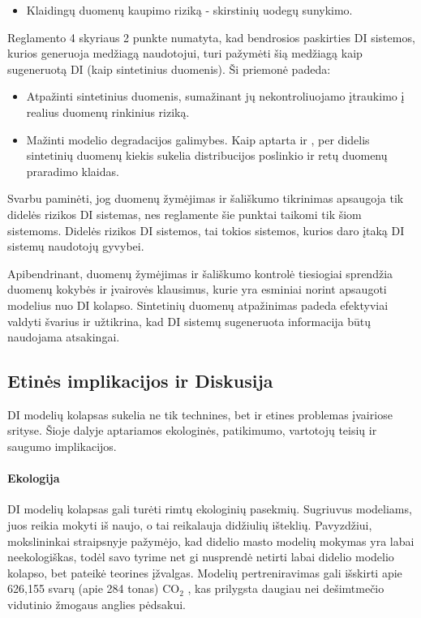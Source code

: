 \documentclass{VUMIFInfKursinis}
\begin{document}
\begin{itemize}
    \item  Klaidingų duomenų kaupimo riziką - skirstinių uodegų sunykimo.
\end{itemize}

Reglamento 4 skyriaus 2 punkte numatyta, kad bendrosios paskirties DI sistemos, kurios generuoja medžiagą naudotojui, turi pažymėti šią medžiagą kaip sugeneruotą DI (kaip sintetinius duomenis). Ši priemonė padeda:

\begin{itemize}
    \item Atpažinti sintetinius duomenis, sumažinant jų nekontroliuojamo įtraukimo į realius duomenų rinkinius riziką.
    \item Mažinti modelio degradacijos galimybes. Kaip aptarta \cite{AICollapseNature} ir \cite{DesniuPasiulymai}, per didelis sintetinių duomenų kiekis sukelia distribucijos poslinkio ir retų duomenų praradimo klaidas.
\end{itemize}

Svarbu paminėti, jog duomenų žymėjimas ir šališkumo tikrinimas apsaugoja tik didelės rizikos DI sistemas, nes reglamente šie punktai taikomi tik šiom sistemoms. Didelės rizikos DI sistemos, tai tokios sistemos, kurios daro įtaką DI sistemų naudotojų gyvybei.

Apibendrinant, duomenų žymėjimas ir šališkumo kontrolė tiesiogiai sprendžia duomenų kokybės ir įvairovės klausimus, kurie yra esminiai norint apsaugoti modelius nuo DI kolapso. Sintetinių duomenų atpažinimas padeda efektyviai valdyti švarius ir užtikrina, kad DI sistemų sugeneruota informacija būtų naudojama atsakingai.



\subsection{Etinės implikacijos ir Diskusija}

DI modelių kolapsas sukelia ne tik technines, bet ir etines problemas įvairiose srityse. Šioje dalyje aptariamos ekologinės, patikimumo, vartotojų teisių ir saugumo implikacijos.

\paragraph{Ekologija} 
DI modelių kolapsas gali turėti rimtų ekologinių pasekmių. Sugriuvus modeliams, juos reikia mokyti iš naujo, o tai reikalauja didžiulių išteklių. Pavyzdžiui, mokslininkai straipsnyje \cite{AICollapseNature} pažymėjo, kad didelio masto modelių mokymas yra labai neekologiškas, todėl savo tyrime net gi nusprendė netirti labai didelio modelio kolapso, bet pateikė teorines įžvalgas. Modelių pertreniravimas gali išskirti apie 626,155 svarų (apie 284 tonas) CO$_2$ \cite{energy_2019}, kas prilygsta daugiau nei dešimtmečio vidutinio žmogaus anglies pėdsakui.
\end{document}
